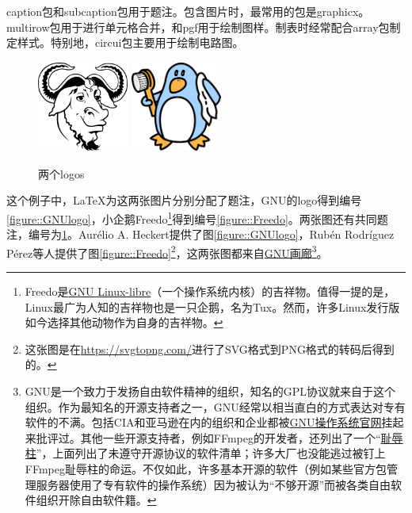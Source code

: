 caption包和subcaption包用于题注。包含图片时，最常用的包是graphicx。multirow包用于进行单元格合并，\TikZ 和pgf用于绘制图样。制表时经常配合array包制定样式。特别地，circui\TikZ 包主要用于绘制电路图。

\begin{figure}[H]
	\centering
		{\includegraphics[height = 3cm, width = 3cm]{contents/assets/img/GNU_logo.png}}
		{\includegraphics[height = 3cm, width = 3cm]{contents/assets/img/Freedo.png}}
	\caption{两个logos}\label{figure::two_logos}
\end{figure}

这个例子中，\LaTeX 为这两张图片分别分配了题注，GNU的logo得到编号\ref*{figure::GNUlogo}，小企鹅Freedo\footnote{Freedo是\href{http://www.fsfla.org/ikiwiki/selibre/linux-libre/}{GNU Linux-libre}（一个操作系统内核）的吉祥物。值得一提的是，Linux最广为人知的吉祥物也是一只企鹅，名为Tux。然而，许多Linux发行版如今选择其他动物作为自身的吉祥物。}得到编号\ref*{figure::Freedo}。两张图还有共同题注，编号为\ref*{figure::two_logos}。Aur\'elio A. Heckert提供了图\ref*{figure::GNUlogo}，Rub\'en Rodr\'iguez P\'erez等人提供了图\ref*{figure::Freedo}\footnote{这张图是在\url{https://svgtopng.com/}进行了SVG格式到PNG格式的转码后得到的。}，这两张图都来自\href{https://www.gnu.org/graphics/graphics.html}{GNU画廊}\footnote{GNU是一个致力于发扬自由软件精神的组织，知名的GPL协议就来自于这个组织。作为最知名的开源支持者之一，GNU经常以相当直白的方式表达对专有软件的不满。包括CIA和亚马逊在内的组织和企业都被\href{https://www.gnu.org/gnu/gnu.html}{GNU操作系统官网}挂起来批评过。其他一些开源支持者，例如FFmpeg的开发者，还列出了一个“\href{https://github.com/FFmpeg/web/blob/master/src/shame}{耻辱柱}”，上面列出了未遵守开源协议的软件清单；许多大厂也没能逃过被钉上FFmpeg耻辱柱的命运。不仅如此，许多基本开源的软件（例如某些官方包管理服务器使用了专有软件的操作系统）因为被认为“不够开源”而被各类自由软件组织开除自由软件籍。}。

